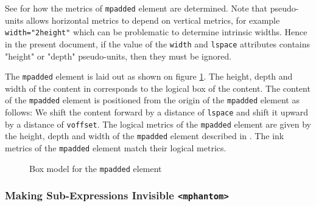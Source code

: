 See \cite{MathML3} for how the metrics of {\tt mpadded} element are determined.
Note that pseudo-units allows horizontal metrics to depend on vertical metrics,
for example {\tt width="2height"} which can be problematic to determine
intrinsic widths. Hence in the present document, if
the value of the {\tt width} and {\tt lspace} attributes contains
"height" or "depth" pseudo-units, then they must be ignored.

The {\tt mpadded} element is laid out as shown on figure
\ref{fig:MpaddedBoxModel}.
The height, depth and width of the content in \cite{MathML3} corresponds to
the logical box of the content. The content of the {\tt mpadded} element is
positioned from the origin of the {\tt mpadded} element as follows: We shift
the content
forward by a distance of {\tt lspace} and shift it upward by a distance of
{\tt voffset}. The logical metrics of the {\tt mpadded} element are given by the
height, depth and width of the {\tt mpadded} element described in
\cite{MathML3}. The ink metrics of the {\tt mpadded} element match their logical
metrics.

\begin{figure}
\centering
{}
\caption{Box model for the {\tt mpadded} element}
\label{fig:MpaddedBoxModel}
\end{figure}

\subsubsection{Making Sub-Expressions Invisible {\tt <mphantom>}}


